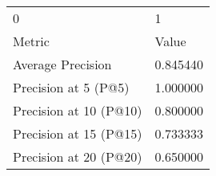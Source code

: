 \begin{tabular}{ll}
0 & 1 \\
Metric & Value \\
Average Precision & 0.845440 \\
Precision at 5 (P@5) & 1.000000 \\
Precision at 10 (P@10) & 0.800000 \\
Precision at 15 (P@15) & 0.733333 \\
Precision at 20 (P@20) & 0.650000 \\
\end{tabular}
